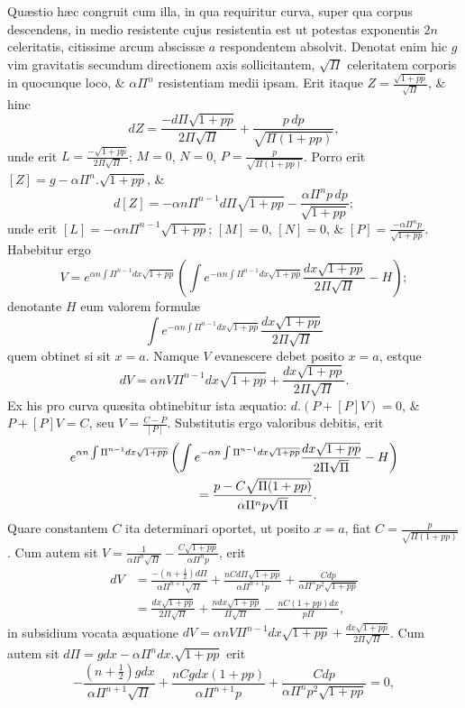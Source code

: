 Quæstio hæc congruit cum illa, in qua requiritur curva, super qua corpus descendens, in medio resistente cujus resistentia est ut potestas exponentis $2n$ celeritatis, citissime arcum abscissæ $a$ respondentem absolvit. Denotat enim hic $g$ vim gravitatis secundum directionem axis sollicitantem, $\sqrt\Pi$ celeritatem corporis in quocunque loco, \& $\alpha\Pi^n$ resistentiam medii ipsam. Erit itaque $Z=\frac{\sqrt{1+pp}}{\sqrt\Pi}$, \& hinc
\[
dZ=\frac{-d\Pi\sqrt{1+pp}}{2\Pi\sqrt\Pi}+\frac{p\,dp}{\sqrt{\Pi(1+pp)}},
\]
unde erit $L=\frac{-\sqrt{1+pp}}{2\Pi\sqrt\Pi}$; $M=0$, $N=0$, $P=\frac{p}{\sqrt{\Pi(1+pp)}}$. Porro erit $[Z]=g-\alpha\Pi^n.\sqrt{1+pp}$, \&
\[
d[Z]=-\alpha n\Pi^{n-1}d\Pi\sqrt{1+pp}-\frac{\alpha\Pi^n p\,dp}{\sqrt{1+pp}};
\]
unde erit $[L]=-\alpha n\Pi^{n-1}\sqrt{1+pp}$; $[M]=0$, $[N]=0$, \& $[P]=\frac{-\alpha\Pi^n p}{\sqrt{1+pp}}$. Habebitur ergo
\[
V=e^{\alpha n\int\Pi^{n-1}dx\sqrt{1+pp}}\left(\int e^{-\alpha n\int\Pi^{n-1}dx\sqrt{1+pp}}\frac{dx\sqrt{1+pp}}{2\Pi\sqrt\Pi}-H\right);
\]
denotante $H$ eum valorem formulæ
\[
\int e^{-\alpha n\int\Pi^{n-1}dx\sqrt{1+pp}}\frac{dx\sqrt{1+pp}}{2\Pi\sqrt\Pi}
\]
quem obtinet si sit $x=a$. Namque $V$ evanescere debet posito $x=a$, estque
\[dV=\alpha nV\Pi^{n-1}dx\sqrt{1+pp}+\frac{dx\sqrt{1+pp}}{2\Pi\sqrt\Pi}.\]
Ex his pro curva quæsita obtinebitur ista æquatio: $d.(P+[P]V)=0$, \& $P+[P]V=C$, seu $V=\frac{C-P}{[P]}$. Substitutis ergo valoribus debitis, erit
\[
\begin{aligned}
&e^{\alpha n\int\Pi^{n-1}dx\sqrt{1+pp}}\left(\int e^{-\alpha n\int\Pi^{n-1}dx\sqrt{1+pp}}\frac{dx\sqrt{1+pp}}{2\Pi\sqrt\Pi}-H\right)\\
&\hspace{35mm}=\frac{p-C\sqrt{\Pi(1+pp)}}{\alpha\Pi^n p\sqrt\Pi}.
\end{aligned}
\]
Quare constantem $C$ ita determinari oportet, ut posito $x=a$, fiat $C=\frac{p}{\sqrt{\Pi(1+pp)}}$. Cum autem sit $V=\frac{1}{\alpha\Pi^n\sqrt\Pi}-\frac{C\sqrt{1+pp}}{\alpha\Pi^n p}$, erit
\[
\begin{aligned}
dV&=\frac{-(n+\frac12)d\Pi}{\alpha\Pi^{n+1}\sqrt\Pi}+\frac{nCd\Pi\sqrt{1+pp}}{\alpha\Pi^{n+1}p}+\frac{Cdp}{\alpha\Pi^n p^2\sqrt{1+pp}}\\
&=\frac{dx\sqrt{1+pp}}{2\Pi\sqrt\Pi}+\frac{ndx\sqrt{1+pp}}{\Pi\sqrt\Pi}-\frac{nC(1+pp)dx}{p\Pi},
\end{aligned}
\]
in subsidium vocata æquatione $dV=\alpha nV\Pi^{n-1}dx\sqrt{1+pp}+\frac{dx\sqrt{1+pp}}{2\Pi\sqrt\Pi}$. Cum autem sit $d\Pi=gdx-\alpha\Pi^n dx.\sqrt{1+pp}$ erit
\[
-\frac{(n+\frac12)gdx}{\alpha\Pi^{n+1}\sqrt\Pi}+\frac{nCgdx(1+pp)}{\alpha\Pi^{n+1}p}+\frac{Cdp}{\alpha\Pi^n p^2\sqrt{1+pp}}=0,
\]
